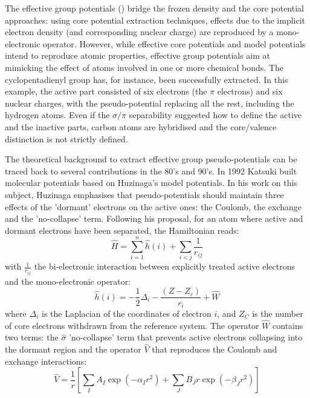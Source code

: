 \documentclass[aip]{revtex4-1}
\begin{document}
The effective group potentials (\showCustomItem) bridge the frozen density and the core potential
approaches: using core potential extraction techniques, effects due to the implicit 
electron density (and corresponding nuclear charge) 
are reproduced by a mono-electronic operator.\cite{carissan_what_2006, raynaud_multicentered_2010}
However, while effective core potentials and model potentials intend to 
reproduce atomic properties,
effective group potentials aim at mimicking the effect of atoms involved in one or more chemical
bonds. The cyclopentadienyl group has, for instance, been successfully extracted.\cite{carissan_what_2006}
In this example, the active part consisted of six electrons (the $\pi$ electrons) and six
nuclear charges, with the pseudo-potential replacing all the rest, including the hydrogen atoms.
Even if the $\sigma / \pi$ separability suggested how to define the active and the inactive parts,
carbon atoms are hybridised and the core/valence distinction is not 
strictly defined.

The theoretical background to extract effective group pseudo-potentials  can be traced back 
to several contributions in the 80's and  90's.\cite{Nicolas1980a, huzinaga_effective_1991, huzinaga_1994_1995, EGP5, EGP6, EGP9}
In 1992 Katsuki built molecular potentials based on Huzinaga's model potentials.\cite{katsuki_molecular_1992,katsuki_spectral_1993}
 In his work on this subject, Huzinaga emphasises that pseudo-potentials should maintain three effects of the
'dormant' electrons on the active ones: the Coulomb, the exchange and the 'no-collapse' term.\cite{huzinaga_effective_1991}
Following his proposal, for an atom where active and dormant electrons have been separated, the Hamiltonian reads:
\begin{equation}
\label{eq:atomicHamiltonian}
\hat{H} = \sum_{i=1}^n \hat{h}(i) +\sum_{i<j}\frac{1}{r_{ij}}
\end{equation}
with $\frac{1}{r_{ij}}$ the bi-electronic interaction
between explicitly treated active electrons and
the mono-electronic operator:
\begin{equation}
\label{eq:monoElectronicOperator}
\hat{h}(i) = -\frac{1}{2}\Delta_i - \frac{(Z-Z_c)}{r_i} + \hat{W}
\end{equation}
where $\Delta_i$ is the Laplacian of the coordinates of electron $i$, and 
$Z_C$ is the number of core electrons withdrawn from the reference system.
The operator $\hat{W}$ contains two terms: the 
$\hat{\sigma}$  'no-collapse' term that prevents active electrons
collapsing into the dormant region and the operator $\hat{V}$ that reproduces the 
Coulomb and exchange interactions:
\begin{equation}
\label{eq:HuzinagaMPVersion1Potential}
\hat{V} = \frac{1}{r}\left[\sum_IA_I\exp(-\alpha_I r^2)+\sum_JB_Jr\exp(-\beta_J r^2)\right]
\end{equation}
\end{document}
